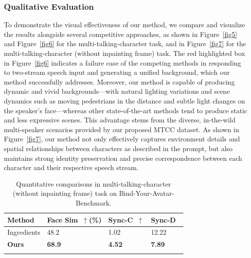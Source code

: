 \subsubsection{Qualitative Evaluation}
To demonstrate the visual effectiveness of our method, we compare and visualize the results alongside several competitive approaches, as shown in Figure~\ref{fig5} and Figure~\ref{fig6} for the multi-talking-character task, and in Figure~\ref{fig7} for the multi-talking-character (without inpainting frame) task. The red highlighted box in Figure~\ref{fig6} indicates a failure case of the competing methods in responding to two-stream speech input and generating a unified background, which our method successfully addresses. Moreover, our method is capable of producing dynamic and vivid backgrounds—with natural lighting variations and scene dynamics such as moving pedestrians in the distance and subtle light changes on the speaker’s face—whereas other state-of-the-art methods tend to produce static and less expressive scenes. This advantage stems from the diverse, in-the-wild multi-speaker scenarios provided by our proposed MTCC dataset.
As shown in Figure~\ref{fig7}, our method not only effectively captures environment details and spatial relationships between characters as described in the prompt, but also maintains strong identity preservation and precise correspondence between each character and their respective speech stream.
\begin{table}[t]
    \centering
    \caption{Quantitative comparisons in multi-talking-character (without inpainting frame) task on Bind-Your-Avatar-Benchmark.}
    \label{table4}
    \fontsize{7.5}{6.5}\selectfont
    \setlength{\tabcolsep}{3pt}
    \renewcommand{\arraystretch}{1.4}
    \begin{tabular}{lC{1.91cm}C{1.91cm}C{1.91cm}}
        \hline 
        \textbf{Method}
        & \textbf{Face Sim~$\uparrow$(\%)}
        & \textbf{Sync-C~$\uparrow$}
        & \textbf{Sync-D~} \\
        \hline
        Ingredients & 48.2 & 1.02 & 12.22  \\ 
        \textbf{Ours} & \textbf{68.9} & \textbf{4.52} & \textbf{7.89}  \\ 
        \hline{}
    \end{tabular}
\end{table}

